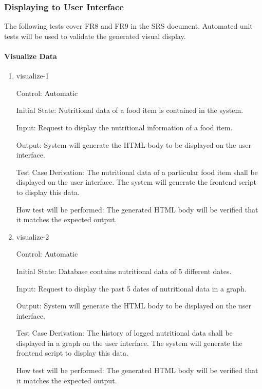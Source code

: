 \documentclass[12pt, titlepage]{article}
\begin{document}
\subsubsection{Displaying to User Interface}

The following tests cover  FR8 and FR9 in the SRS document. Automated unit tests will be used to validate the generated visual display.

\paragraph{Visualize Data}

\begin{enumerate}
	
	\item{visualize-1\\}
	
	Control: Automatic
	
	Initial State: Nutritional data of a food item is contained in the system.
	
	Input: Request to display the nutritional information of a food item.
	
	Output: System will generate the HTML body to be displayed on the user interface.
	
	Test Case Derivation: The nutritional data of a particular food item shall be displayed on the user interface. The system will generate the frontend script to display this data.
	
	How test will be performed: The generated HTML body will be verified that it matches the expected output.
	
	\item{visualize-2\\}
	
	Control: Automatic
	
	Initial State: Database contains nutritional data of 5 different dates.
	
	Input: Request to display the past 5 dates of nutritional data in a graph.
	
	Output: System will generate the HTML body to be displayed on the user interface.
	
	Test Case Derivation: The history of logged nutritional data shall be displayed in a graph on the user interface. The system will generate the frontend script to display this data.
	
	How test will be performed: The generated HTML body will be verified that it matches the expected output.
	
\end{enumerate}
	
\end{document}
